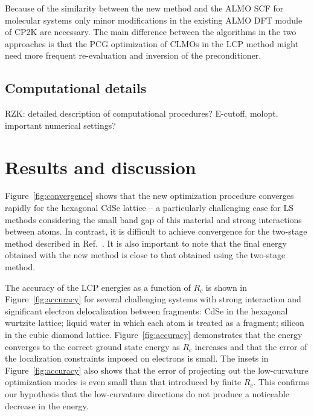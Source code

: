 \documentclass[aps,prl,twocolumn,reprint,amsmath,amssymb]{revtex4-1}
\begin{document}
Because of the similarity between the new method and the ALMO SCF for molecular systems only minor modifications in the existing ALMO DFT module of CP2K are necessary. The main difference between the algorithms in the two approaches is that the PCG optimization of CLMOs in the LCP method might need more frequent re-evaluation and inversion of the preconditioner.


\subsection{Computational details}

RZK: detailed description of computational procedures? E-cutoff, molopt. important numerical settings?

\section{Results and discussion}


Figure~\ref{fig:convergence} shows that the new optimization procedure converges rapidly for the hexagonal CdSe lattice -- a particularly challenging case for LS methods considering the small band gap of this material and strong interactions between atoms. 
In contrast, it is difficult to achieve convergence for the two-stage method described in Ref.~\cite{khaliullin2013efficient}. 
It is also important to note that the final energy obtained with the new method is close to that obtained using the two-stage method. %


The accuracy of the LCP energies as a function of $R_c$ is shown in Figure~\ref{fig:accuracy} for several challenging systems with strong interaction and significant electron delocalization between fragments: CdSe in the hexagonal wurtzite lattice; liquid water in which each atom is treated as a fragment; silicon in the cubic diamond lattice. 
Figure~\ref{fig:accuracy} demonstrates that the energy converges to the correct ground state energy as $R_c$ increases and that the error of the localization constraints imposed on electrons is small. The insets in Figure~\ref{fig:accuracy} also shows that the error of projecting out the low-curvature optimization modes is even small than that introduced by finite $R_c$. This confirms our hypothesis that the low-curvature directions do not produce a noticeable decrease in the energy.
\end{document}
